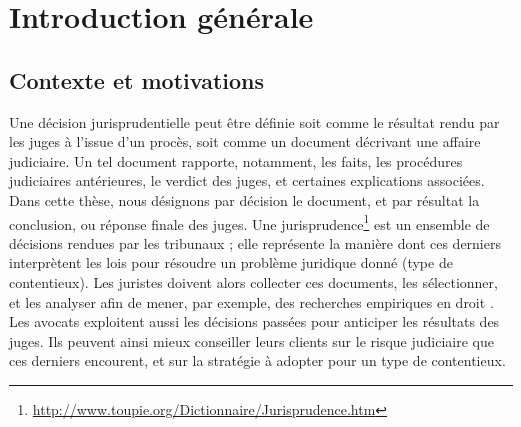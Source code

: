 \chapter*{Introduction générale}
\label{chap:intro}

\section{Contexte et motivations}
\label{sec:intro:contexte}
Une décision jurisprudentielle peut être définie soit comme  le résultat rendu par les juges à l'issue d'un procès, soit comme un document décrivant une affaire judiciaire. Un tel document rapporte, notamment,  les faits, les procédures judiciaires antérieures, le verdict des juges, et certaines explications associées. Dans cette thèse, nous désignons par \og décision \fg{} le document, et par  \og résultat\fg{} la conclusion, ou réponse finale des juges. Une jurisprudence\footnote{\url{http://www.toupie.org/Dictionnaire/Jurisprudence.htm}} est un ensemble de décisions rendues par les tribunaux ; elle représente la manière dont ces derniers interprètent les lois pour résoudre un problème juridique donné (type de contentieux). Les juristes doivent alors collecter ces documents, les sélectionner, et les analyser afin de mener, par exemple, des recherches empiriques en droit \citep{ancel2003expulsion, jeandidier2006pensions}. Les avocats exploitent aussi les décisions passées pour anticiper les résultats des juges. Ils peuvent ainsi mieux conseiller leurs clients sur le risque judiciaire que ces derniers encourent, et sur la stratégie à adopter pour un type de contentieux. 

